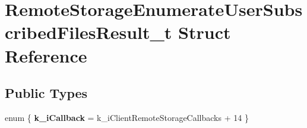 \hypertarget{structRemoteStorageEnumerateUserSubscribedFilesResult__t}{}\section{Remote\+Storage\+Enumerate\+User\+Subscribed\+Files\+Result\+\_\+t Struct Reference}
\label{structRemoteStorageEnumerateUserSubscribedFilesResult__t}
\subsection*{Public Types}
\begin{DoxyCompactItemize}
\item 
\hypertarget{structRemoteStorageEnumerateUserSubscribedFilesResult__t_abf3624e841241093c04f66f38e0ea8d2}{}enum \{ {\bfseries k\+\_\+i\+Callback} = k\+\_\+i\+Client\+Remote\+Storage\+Callbacks + 14
 \}\label{structRemoteStorageEnumerateUserSubscribedFilesResult__t_abf3624e841241093c04f66f38e0ea8d2}

\end{DoxyCompactItemize}
